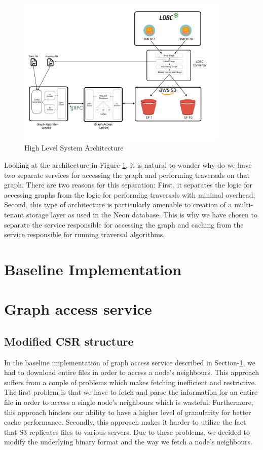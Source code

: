 \begin{figure}[ht]
    \centering
    \includegraphics[width=0.9\textwidth]{figures/architecture.png}
    \caption{High Level System Architecture}
    \label{fig:sysArch}
\end{figure}

Looking at the architecture in Figure-\ref{fig:sysArch}, it is natural to wonder
why do we have two separate services for accessing the graph and performing
traversals on that graph. There are two reasons for this separation: First, it
separates the logic for accessing graphs from the logic for performing
traversals with minimal overhead; Second, this type of architecture is
particularly amenable to creation of a multi-tenant storage layer as used
in the Neon database\cite{neonPostgres}. This is why we have chosen to separate
the service responsible for accessing the graph and caching from the service
responsible for running traversal algorithms.
\section{Baseline Implementation}\label{sec:baseline}
\section{Graph access service}\label{sec:graphAccess}
\subsection{Modified CSR structure}\label{sec:modifiedCsr}
In the baseline implementation of graph access service described in
Section-\ref{sec:baseline}, we had to download entire files in order to access
a node's neighbours. This approach suffers from a couple of problems which makes
fetching inefficient and restrictive. The first problem is that we have to
fetch and parse the information for an entire file in order to access a single
node's neighbours which is wasteful. Furthermore, this approach hinders our
ability to have a  higher level of granularity for better cache performance.
Secondly, this approach makes it harder to utilize the fact that S3 replicates
files to various servers. Due to these problems, we decided to modify the
underlying binary format and the way we fetch a node's neighbours.

